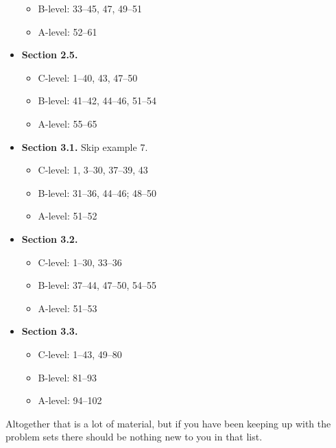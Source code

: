 \documentclass[11pt]{article}
\begin{document}
\begin{itemize}
\begin{itemize}
  \item B-level: 33--45, 47, 49--51
  \item A-level: 52--61
  \end{itemize}
\item \textbf{Section 2.5.}
  \begin{itemize}
  \item C-level: 1--40, 43, 47--50
  \item B-level: 41--42, 44--46, 51--54
  \item A-level: 55--65
  \end{itemize}
\item \textbf{Section 3.1.} Skip example 7.
  \begin{itemize}
  \item C-level: 1, 3--30, 37--39, 43
  \item B-level: 31--36, 44--46; 48--50
  \item A-level: 51--52
  \end{itemize}
\item \textbf{Section 3.2.}
  \begin{itemize}
  \item C-level: 1--30, 33--36
  \item B-level: 37--44, 47--50, 54--55
  \item A-level: 51--53
  \end{itemize}
\item \textbf{Section 3.3.}
  \begin{itemize}
  \item C-level: 1--43, 49--80
  \item B-level: 81--93
  \item A-level: 94--102
  \end{itemize}
\end{itemize}
Altogether that is a lot of material, but if you have been keeping up
with the problem sets there should be nothing new to you in that list.
\end{document}
